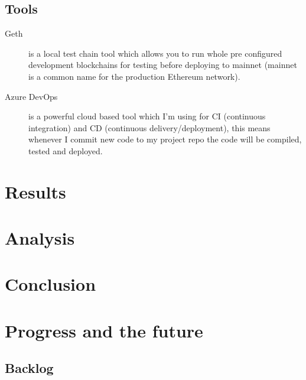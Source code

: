 \documentclass[12pt]{report}
\begin{document}
\section{Tools}

\begin{description}
	\item[Geth] is a local test chain tool which allows you to run whole pre configured development blockchains for testing before deploying to mainnet (mainnet is a common name for the production Ethereum network).
	\item[Azure DevOps] is a powerful cloud based tool which I'm using for CI (continuous integration) and CD (continuous delivery/deployment), this means whenever I commit new code to my project repo the code will be compiled, tested and deployed.
\end{description}

\chapter{Results}

\chapter{Analysis}

\chapter{Conclusion}

\chapter{Progress and the future}


\section{Backlog}




\end{document}
